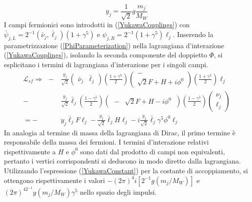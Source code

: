 \documentclass[11pt]{article}
\begin{document}
    \begin{equation}\label{YukawaConstant}
    y_j=\frac{1}{\sqrt{2}}g\frac{m_j}{M_W}
    \end{equation}
    I campi fermionici sono introdotti in (\ref{YukawaCouplings}) con $\bar{\psi}_{j,L}=2^{-1}\left(\bar{\nu}_j,\bar{\ell}_j\right)(1+\gamma^5)$ e $\psi_{j,R}=2^{-1}(1+\gamma^5)\ell_{j}$.
    Inserendo la parametrizzazione (\ref{PhiParameterization}) nella lagrangiana d'interazione (\ref{YukawaCouplings}), isolando la seconda componente del doppietto $\Phi$,
    si esplicitano i termini di lagrangiana d'interazione per i singoli campi.
    \begin{equation}
    \begin{split}
    \mathcal{L}_{sf}\Longrightarrow\ \ -&\frac{y_j}{\sqrt{2}}\begin{pmatrix}\bar{\nu}_{j} & \bar{\ell}_{j}\end{pmatrix}\left(\frac{1+\gamma^5}{2}\right)\begin{pmatrix}-\\ \sqrt{2}F+H+i\phi^0\end{pmatrix}\left(\frac{1+\gamma^5}{2}\right)\ell_j\\
    -&\frac{y_j}{\sqrt{2}}\bar{\ell}_j\left(\frac{1-\gamma^5}{2}\right)\begin{pmatrix} \ - &\sqrt{2}F+H-i\phi^0\ \end{pmatrix}\left(\frac{1-\gamma^5}{2}\right)\begin{pmatrix} \nu_j\\ \ell_j \end{pmatrix}\\
    =-&y_j\bar{\ell}_jF\ell_j-\frac{y_j}{\sqrt{2}}\bar{\ell}_j H \ell_j-i\frac{y_j}{\sqrt{2}}\bar{\ell}_j \gamma^5\phi^0 \ell_j
    \end{split}
    \end{equation}
    In analogia al termine di massa della lagrangiana di Dirac, il primo termine è responsabile della massa dei fermioni. I termini d'interazione relativi rispettivamente a $H$ e $\phi^0$ sono dati dal prodotto di campi non equivalenti, pertanto i vertici corrispondenti si deducono in modo diretto dalla lagrangiana.
    Utilizzando l'espressione (\ref{YukawaConstant}) per la costante di accoppiamento, si ottengono rispettivamente i valori $-(2\pi)^4i[2^{-1}g(m_j/M_W)]$ e $(2\pi)^42^{-1}g(m_j/M_W)\gamma^5$ nello spazio degli impulsi.
\end{document}
